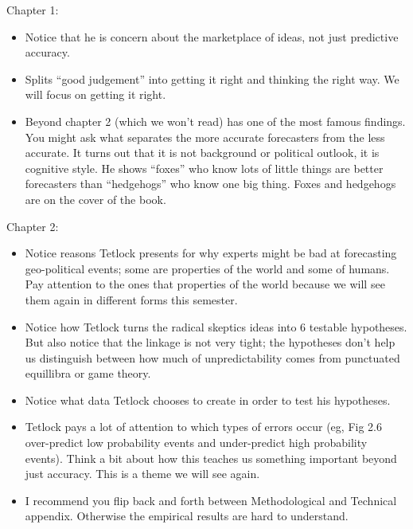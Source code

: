\documentclass[aspectratio=169]{beamer}
\begin{document}
\begin{frame}

Chapter 1:
\begin{itemize}
\item Notice that he is concern about the marketplace of ideas, not just predictive accuracy.
\pause
\item Splits ``good judgement'' into getting it right and thinking the right way.  We will focus on getting it right.
\pause
\item Beyond chapter 2 (which we won't read) has one of the most famous findings. You might ask what separates the more accurate forecasters from the less accurate.  It turns out that it is not background or political outlook, it is cognitive style.  He shows ``foxes'' who know lots of little things are better forecasters than ``hedgehogs'' who know one big thing.  Foxes and hedgehogs are on the cover of the book. 
\end{itemize}

\end{frame}
\begin{frame}

Chapter 2:
\begin{itemize}
\item Notice reasons Tetlock presents for why experts might be bad at forecasting geo-political events; some are properties of the world and some of humans.  Pay attention to the ones that properties of the world because we will see them again in different forms this semester.
\pause
\item Notice how Tetlock turns the radical skeptics ideas into 6 testable hypotheses. But also notice that the linkage is not very tight; the hypotheses don't help us distinguish between how much of unpredictability comes from punctuated equillibra or game theory.
\pause
\item Notice what data Tetlock chooses to create in order to test his hypotheses.
\pause
\item Tetlock pays a lot of attention to which types of errors occur (eg, Fig 2.6 over-predict low probability events and under-predict high probability events).  Think a bit about how this teaches us something important beyond just accuracy.  This is a theme we will see again.
\pause
\item I recommend you flip back and forth between Methodological and Technical appendix.  Otherwise the empirical results are hard to understand.
\end{itemize}

\end{frame}
\end{document}
